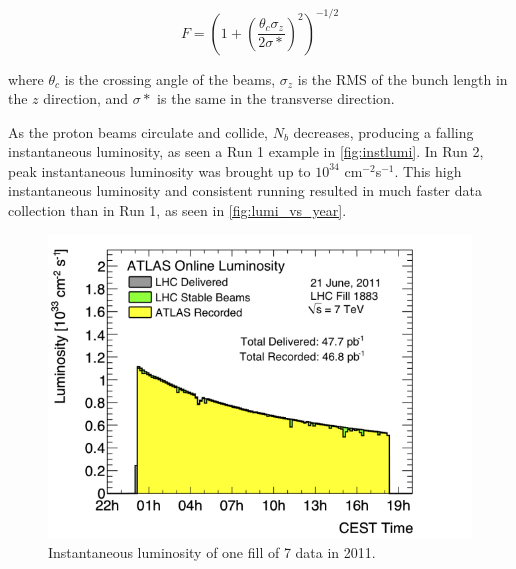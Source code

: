 \begin{equation}
F = (1+ (\frac{\theta_c \sigma_z}{2\sigma*})^2)^{-1/2}
\end{equation}

where $\theta_c$ is the crossing angle of the beams, $\sigma_z$ is the RMS of the bunch length in the $z$ direction, and $\sigma*$ is the same in the transverse direction.

As the proton beams circulate and collide, $N_b$ decreases, producing a falling instantaneous luminosity, as seen a Run 1 example in \autoref{fig:instlumi}. In Run 2, peak instantaneous luminosity was brought up to $10^{34}$ cm$^{-2}$s$^{-1}$. This high instantaneous luminosity and consistent running resulted in much faster data collection than in Run 1, as seen in \autoref{fig:lumi_vs_year}. 

\begin{centering}
\begin{figure}[!hbt]
\myfloatalign
\includegraphics[width=.90\linewidth]{figures/lhc/lumi1883.jpg}
\caption{Instantaneous luminosity of one fill of 7 \tev data in 2011.}
\label{fig:instlumi}
\end{figure}
\end{centering}

